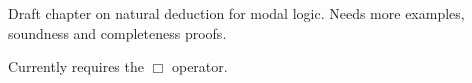 \documentclass[../../../include/open-logic-chapter]{subfiles}
\begin{document}
\begin{editorial}
  Draft chapter on natural deduction for modal logic. Needs more
  examples, soundness and completeness proofs.

  Currently requires the $\Box$ operator.
\end{editorial}




\OLEndChapterHook
\end{document}
